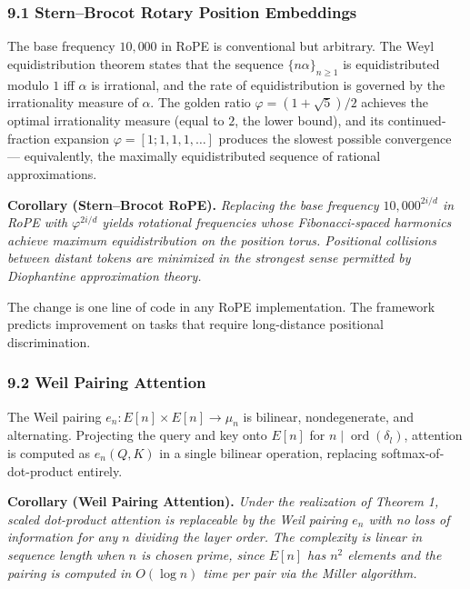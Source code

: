 \documentclass[
  11pt,
]{article}
\begin{document}
\hypertarget{sternbrocot-rotary-position-embeddings}{%
\subsubsection{9.1 Stern--Brocot Rotary Position
Embeddings}\label{sternbrocot-rotary-position-embeddings}}

The base frequency \(10{,}000\) in RoPE is conventional but arbitrary.
The Weyl equidistribution theorem states that the sequence
\(\{n\alpha\}_{n \geq 1}\) is equidistributed modulo \(1\) iff
\(\alpha\) is irrational, and the rate of equidistribution is governed
by the irrationality measure of \(\alpha\). The golden ratio
\(\varphi = (1 + \sqrt{5})/2\) achieves the optimal irrationality
measure (equal to \(2\), the lower bound), and its continued-fraction
expansion \(\varphi = [1; 1, 1, 1, \dots]\) produces the slowest
possible convergence --- equivalently, the maximally equidistributed
sequence of rational approximations.

\textbf{Corollary (Stern--Brocot RoPE).} \emph{Replacing the base
frequency \(10{,}000^{2i/d}\) in RoPE with \(\varphi^{2i/d}\) yields
rotational frequencies whose Fibonacci-spaced harmonics achieve maximum
equidistribution on the position torus. Positional collisions between
distant tokens are minimized in the strongest sense permitted by
Diophantine approximation theory.}

The change is one line of code in any RoPE implementation. The framework
predicts improvement on tasks that require long-distance positional
discrimination.

\hypertarget{weil-pairing-attention}{%
\subsubsection{9.2 Weil Pairing
Attention}\label{weil-pairing-attention}}

The Weil pairing \(e_n : E[n] \times E[n] \to \mu_n\) is bilinear,
nondegenerate, and alternating. Projecting the query and key onto
\(E[n]\) for \(n \mid \operatorname{ord}(\delta_l)\), attention is
computed as \(e_n(Q, K)\) in a single bilinear operation, replacing
softmax-of-dot-product entirely.

\textbf{Corollary (Weil Pairing Attention).} \emph{Under the realization
of Theorem 1, scaled dot-product attention is replaceable by the Weil
pairing \(e_n\) with no loss of information for any \(n\) dividing the
layer order. The complexity is linear in sequence length when \(n\) is
chosen prime, since \(E[n]\) has \(n^2\) elements and the pairing is
computed in \(O(\log n)\) time per pair via the Miller algorithm.}
\end{document}
